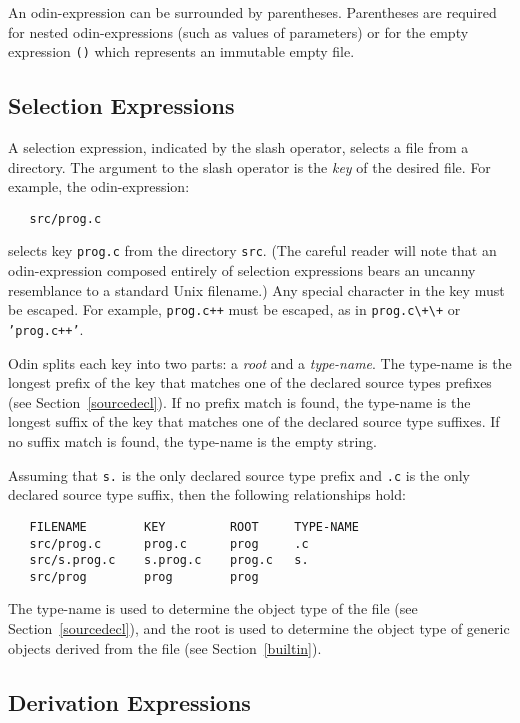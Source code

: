 \documentclass[hidelinks]{report}
\newcommand{\ex}{\tt}   %
\begin{document}
An odin-expression can be surrounded by parentheses.
Parentheses are required for nested odin-expressions
(such as values of parameters) or for the empty expression
{\ex ()} which represents an immutable empty file.

\subsection{Selection Expressions}
\label{selection}

A selection expression, indicated by the slash operator,
selects a file from a directory.
The argument to the slash operator is the {\em key} of the desired file.
For example, the odin-expression:
\begin{verbatim}
   src/prog.c
\end{verbatim}
selects key {\ex prog.c} from the directory {\ex src}.
(The careful reader will note that an odin-expression composed entirely
of selection expressions bears an uncanny resemblance to a standard
Unix filename.)
Any special character in the key must be escaped.
For example, {\ex prog.c++} 
must be escaped, as in {\ex prog.c\verb.\.+\verb.\.+} or {\ex 'prog.c++'}.

Odin splits each key into two parts: a {\em root} and a {\em type-name}.
The type-name is the longest prefix of the key
that matches one of the declared source types prefixes
(see Section~\ref{sourcedecl}).
If no prefix match is found, the type-name is the longest suffix of the
key that matches one of the declared source type suffixes.
If no suffix match is found, the type-name is the empty string.

Assuming that {\ex s.} is the only declared source type prefix and
{\ex .c} is the only declared source type suffix, then the following
relationships hold:
\begin{verbatim}
   FILENAME        KEY         ROOT     TYPE-NAME
   src/prog.c      prog.c      prog     .c
   src/s.prog.c    s.prog.c    prog.c   s.
   src/prog        prog        prog 
\end{verbatim}
The type-name is used to determine the object type of the file
(see Section~\ref{sourcedecl}),
and the root is used to determine the object type of generic
objects derived from the file (see Section~\ref{builtin}).

\subsection{Derivation Expressions}
\end{document}
